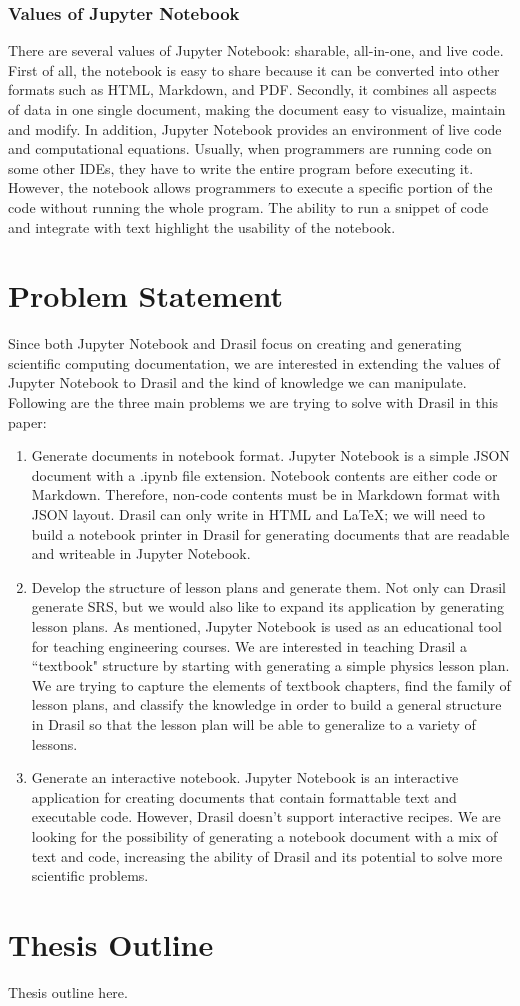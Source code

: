 \subsubsection{Values of Jupyter Notebook}
There are several values of Jupyter Notebook: sharable, all-in-one, and live 
code. First of all, the notebook is easy to share because it can be converted 
into other formats such as HTML, Markdown, and PDF. Secondly, it combines all 
aspects of data in one single document, making the document easy to visualize, 
maintain and modify. In addition, Jupyter Notebook provides an environment of 
live code and computational equations. Usually, when programmers are running 
code on some other IDEs, they have to write the entire program before executing 
it. However, the notebook allows programmers to execute a specific portion of 
the code without running the whole program. The ability to run a snippet of 
code and integrate with text highlight the usability of the notebook.

\section{Problem Statement}
Since both Jupyter Notebook and Drasil focus on creating and generating 
scientific computing documentation, we are interested in extending the values 
of Jupyter Notebook to Drasil and the kind of knowledge we can manipulate. 
Following are the three main problems we are trying to solve with Drasil in 
this paper:

\begin{enumerate}
	\item Generate documents in notebook format. Jupyter Notebook is a simple 
	JSON document with a .ipynb file extension. Notebook contents are either 
	code or Markdown. Therefore, non-code contents must be in Markdown format 
	with JSON layout. Drasil can only write in HTML and LaTeX; we will need to 
	build a notebook printer in Drasil for generating documents that are 
	readable and writeable in Jupyter Notebook.
	\item Develop the structure of lesson plans and generate them. Not only can 
	Drasil generate SRS, but we would also like to expand its application by 
	generating lesson plans. As mentioned, Jupyter Notebook is used as an 
	educational tool for teaching engineering courses. We are interested in 
	teaching Drasil a ``textbook" structure by starting with generating a 
	simple physics lesson plan. We are trying to capture the elements of 
	textbook chapters, find the family of lesson plans, and classify the 
	knowledge in order to build a general structure in Drasil so that the 
	lesson plan will be able to generalize to a variety of lessons.
	\item Generate an interactive notebook. Jupyter Notebook is an interactive 
	application for creating documents that contain formattable text and 
	executable code. However, Drasil doesn't support interactive recipes. We 
	are looking for the possibility of generating a notebook document with a 
	mix of text and code, increasing the ability of Drasil and its potential to 
	solve more scientific problems.
\end{enumerate}

\section{Thesis Outline}
Thesis outline here.